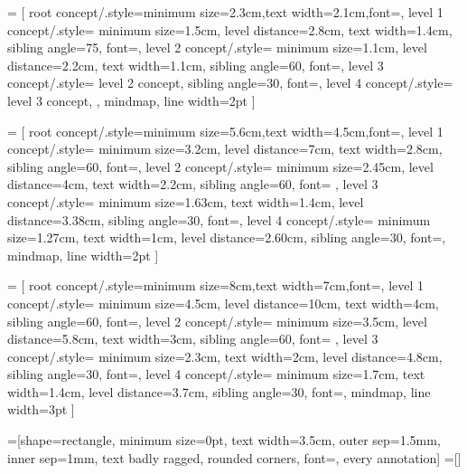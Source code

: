 =
  [%
  root concept/.style={minimum size=2.3cm,text width=2.1cm,font=\pgfutil@font@footnotesize},
  level 1 concept/.style={%
    minimum size=1.5cm,
    level distance=2.8cm,
    text width=1.4cm,
    sibling angle=75,
    font=\pgfutil@font@scriptsize},%
  level 2 concept/.style={%
    minimum size=1.1cm,%
    level distance=2.2cm,%
    text width=1.1cm,%
    sibling angle=60,%
    font=\pgfutil@font@tiny},%
  level 3 concept/.style={%
  	level 2 concept,
    sibling angle=30,%
    font=\pgfutil@font@tiny},%
  level 4 concept/.style={%
  	level 3 concept,
  },
  mindmap,%
  line width=2pt
  ]
  
=
  [%
  root concept/.style={minimum size=5.6cm,text width=4.5cm,font=\pgfutil@font@Large},
  level 1 concept/.style={%
    minimum size=3.2cm,
    level distance=7cm,
    text width=2.8cm,
    sibling angle=60,
    font=},%
  level 2 concept/.style={%
    minimum size=2.45cm,%
    level distance=4cm,%
    text width=2.2cm,%
    sibling angle=60,%
    font=\pgfutil@font@small%
    },%
  level 3 concept/.style={%
    minimum size=1.63cm,%
    text width=1.4cm,%
    level distance=3.38cm,%
    sibling angle=30,%
    font=\pgfutil@font@scriptsize},%
  level 4 concept/.style={%
    minimum size=1.27cm,%
    text width=1cm,
    level distance=2.60cm,%
    sibling angle=30,%
    font=\pgfutil@font@tiny},%
  mindmap,%
  line width=2pt
  ]
  
=
  [%
  root concept/.style={minimum size=8cm,text width=7cm,font=\pgfutil@font@huge},
  level 1 concept/.style={%
    minimum size=4.5cm,
    level distance=10cm,
    text width=4cm,
    sibling angle=60,
    font=\pgfutil@font@large},%
  level 2 concept/.style={%
    minimum size=3.5cm,%
    level distance=5.8cm,%
    text width=3cm,%
    sibling angle=60,%
    font=%
    },%
  level 3 concept/.style={%
    minimum size=2.3cm,%
    text width=2cm,%
    level distance=4.8cm,%
    sibling angle=30,%
    font=\pgfutil@font@footnotesize},%
  level 4 concept/.style={%
    minimum size=1.7cm,%
    text width=1.4cm,
    level distance=3.7cm,%
    sibling angle=30,%
    font=\pgfutil@font@scriptsize},%
  mindmap,%
  line width=3pt
  ]
  


=[shape=rectangle,
                        minimum size=0pt,
                        text width=3.5cm,
                        outer sep=1.5mm,
                        inner sep=1mm,
                        text badly ragged,
                        rounded corners,
                        font=\pgfutil@font@tiny,
                        every annotation]
=[]



\endinput

